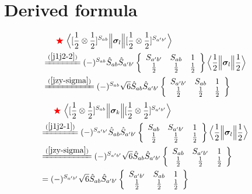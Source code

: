 \documentclass[master]{shnuthesis}
\newcommand{\ap}{a^\prime}
\newcommand{\bp}{b^\prime}
\newcommand{\il}{\!\!\!\!\!\!\!\!\!\!}
\newcommand{\zdydh}{\xlongequal}
\newcommand{\redstar}{{\color{red} \bigstar}\,\,}
\begin{document}
\section{Derived formula}
\begin{align}
    & \redstar \Big\langle [\frac{1}{2}\otimes\frac{1}{2}]^{S_{ab}} \Big\| \bm{\sigma}_l \Big\| [\frac{1}{2}\otimes\frac{1}{2}]^{S_{\ap\bp}} \Big\rangle \notag\\
    & \il \zdydh{(\ref{j1j2-2})} (-)^{S_{ab}}\hat{S}_{ab}\hat{S}_{\ap\bp}  \left\{\begin{array}{ccc} S_{\ap\bp} & S_{ab} & 1 \\ \frac{1}{2} & \frac{1}{2} & \frac{1}{2} \end{array}\right\}  \Big\langle \frac{1}{2} \Big\| \bm{\sigma}_l \Big\| \frac{1}{2} \Big\rangle \\
    & \il \zdydh{(\ref{jzy-sigma})} (-)^{S_{ab}}\sqrt{6}\hat{S}_{ab}\hat{S}_{\ap\bp}  \left\{\begin{array}{ccc} S_{\ap\bp} & S_{ab} & 1 \\ \frac{1}{2} & \frac{1}{2} & \frac{1}{2} \end{array}\right\} \label{sigma-l}
\end{align}
\begin{align}
    & \redstar \Big\langle [\frac{1}{2}\otimes\frac{1}{2}]^{S_{ab}} \Big\| \bm{\sigma}_k \Big\| [\frac{1}{2}\otimes\frac{1}{2}]^{S_{\ap\bp}} \Big\rangle \\
    & \il \zdydh{(\ref{j1j2-1})} (-)^{S_{\ap\bp}} \hat{S}_{ab}\hat{S}_{\ap\bp}  \left\{\begin{array}{ccc} S_{ab} & S_{\ap\bp} & 1 \\ \frac{1}{2} & \frac{1}{2} & \frac{1}{2} \end{array}\right\}  \Big\langle \frac{1}{2} \Big\| \bm{\sigma}_l \Big\| \frac{1}{2} \Big\rangle \\
    & \il \zdydh{(\ref{jzy-sigma})} (-)^{S_{\ap\bp}} \sqrt{6}\hat{S}_{ab}\hat{S}_{\ap\bp}  \left\{\begin{array}{ccc} S_{ab} & S_{\ap\bp} & 1 \\ \frac{1}{2} & \frac{1}{2} & \frac{1}{2} \end{array}\right\} \\
    & \il = (-)^{S_{\ap\bp}} \sqrt{6}\hat{S}_{ab}\hat{S}_{\ap\bp}  \left\{\begin{array}{ccc} S_{\ap\bp} & S_{ab} & 1 \\ \frac{1}{2} & \frac{1}{2} & \frac{1}{2} \end{array}\right\} \label{sigma-k}
\end{align}
\end{document}
